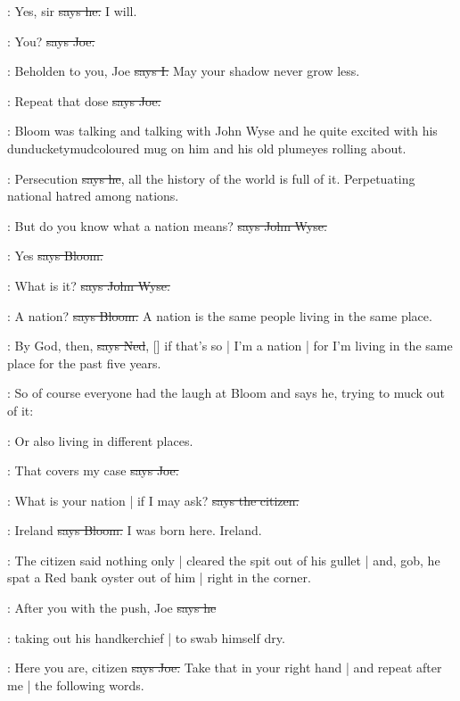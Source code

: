 \citizen:
Yes,
sir
\sout{says he.}
I will.

\joe:
You?
\sout{says Joe.}

:
Beholden to you,
Joe
\sout{says I.}
May your shadow never grow less.

\joe:
Repeat that dose
\sout{says Joe.}

\Nq:
Bloom was talking and talking with John Wyse
and he quite excited with his dunducketymudcoloured mug on him
and his old plumeyes rolling about.

\Bloom:
Persecution
\sout{says he},
all the history of the world is full of it.
Perpetuating national hatred among nations.

\johnwyse:
But do you know what a nation means?
\sout{says John Wyse.}

\Bloom:
Yes
\sout{says Bloom.}

\johnwyse:
What is it?
\sout{says John Wyse.}

\Bloom:
A nation?
\sout{says Bloom.}
A nation is the same people living in the same place.

\lambert:
By God,
then,
\sout{says Ned},
[] if that's so |
I'm a nation |
for I'm living in the same place for the past five years.

\Nq:
So of course everyone had the laugh at Bloom and says he,
trying to muck out of it:

\Bloom:
Or also living in different places.

\joe:
That covers my case
\sout{says Joe.}

\citizen:
What is your nation |
if I may ask?
\sout{says the citizen.}

\Bloom:
Ireland
\sout{says Bloom.}
I was born here.
Ireland.

\Nq:
The citizen said nothing only |
cleared the spit out of his gullet |
and,
gob,
he spat a Red bank oyster out of him |
right in the corner.

\citizen:
After you with the push,
Joe
\sout{says he}

\Nq:
taking out his handkerchief |
to swab himself dry.

\joe:
Here you are,
citizen
\sout{says Joe.}
Take that in your right hand |
and repeat after me |
the following words.

